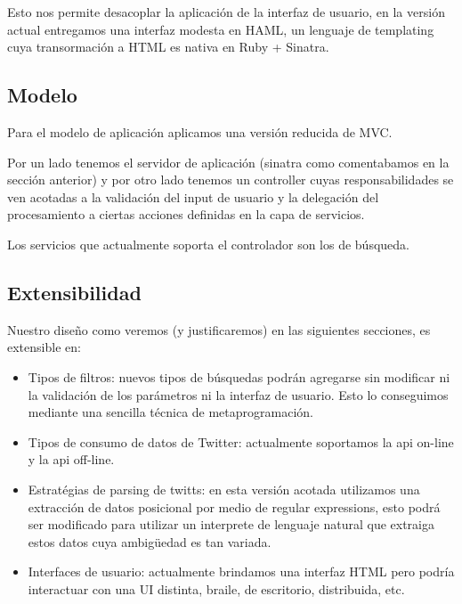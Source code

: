 Esto nos permite desacoplar la aplicaci\'on de la interfaz de usuario, en la versi\'on actual entregamos una interfaz modesta en HAML, un lenguaje de templating cuya transormaci\'on a HTML es nativa en Ruby + Sinatra.

\subsection{Modelo}

Para el modelo de aplicaci\'on aplicamos una versi\'on reducida de MVC.

Por un lado tenemos el servidor de aplicaci\'on (sinatra como comentabamos en la secci\'on anterior) y por otro lado tenemos un controller cuyas responsabilidades se ven acotadas a la validaci\'on del input de usuario y la delegaci\'on del procesamiento a ciertas acciones definidas en la capa de servicios.

Los servicios que actualmente soporta el controlador son los de b\'usqueda.

\subsection{Extensibilidad}

Nuestro dise\~no como veremos (y justificaremos) en las siguientes secciones, es extensible en:

\begin{itemize}
    \item Tipos de filtros: nuevos tipos de b\'usquedas podr\'an agregarse sin modificar ni la validaci\'on de los par\'ametros ni la interfaz de usuario. Esto lo conseguimos mediante una sencilla t\'ecnica de metaprogramaci\'on.
    \item Tipos de consumo de datos de Twitter: actualmente soportamos la api on-line y la api off-line. 
    \item Estrat\'egias de parsing de twitts: en esta versi\'on acotada utilizamos una extracci\'on de datos posicional por medio de regular expressions, esto podr\'a ser modificado para utilizar un interprete de lenguaje natural que extraiga estos datos cuya ambig\"uedad es tan variada.
    \item Interfaces de usuario: actualmente brindamos una interfaz HTML pero podr\'ia interactuar con una UI distinta, braile, de escritorio, distribuida, etc.
\end{itemize}


